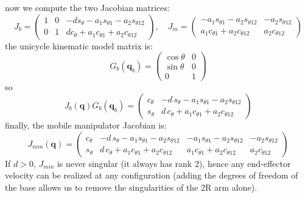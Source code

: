\documentclass[10pt, a4paper]{report}
\newcommand{\q}{{\mathbf q}}
\begin{document}
now we compute the two Jacobian matrices:\begin{equation}
    J_b=\begin{pmatrix}
        1&0&-ds_\theta-a_1s_{\theta1}-a_2s_{\theta12}\\
        0&1&dc_\theta+a_1c_{\theta1}+a_2c_{\theta12}
    \end{pmatrix},\quad 
    J_m=\begin{pmatrix}
        -a_1s_{\theta1}-a_2s_{\theta12}&-a_2s_{\theta12}\\
        a_1c_{\theta1}+a_2c_{\theta12}&a_2c_{\theta12}
    \end{pmatrix}
\end{equation}
the unicycle kinematic model matrix is:
\begin{equation}
    G_b(\q_b)=\begin{pmatrix}
         \cos\theta&0\\\sin\theta&0\\ 0&1
    \end{pmatrix}
\end{equation}
so\begin{equation}
    J_b(\q)G_b(\q_b)=\begin{pmatrix}
c_\theta & -d \, s_\theta - a_1 s_{\theta 1} - a_2 s_{\theta 1 2} \\[6pt]
s_\theta & d \, c_\theta + a_1 c_{\theta 1} + a_2 c_{\theta 1 2} 
\end{pmatrix}
\end{equation}
finally, the mobile manipulator Jacobian is:\begin{equation}
J_{mm}(\q)=\begin{pmatrix}
c_\theta & -d \, s_\theta - a_1 s_{\theta 1} - a_2 s_{\theta 1 2} & -a_1 s_{\theta 1} - a_2 s_{\theta 1 2} & -a_2 s_{\theta 1 2} \\[6pt]
s_\theta & d \, c_\theta + a_1 c_{\theta 1} + a_2 c_{\theta 1 2} & a_1 c_{\theta 1} + a_2 c_{\theta 1 2} & a_2 c_{\theta 1 2}
\end{pmatrix}
\end{equation}
If $d>0$, $J_{mm}$ is never singular (it always has rank 2), hence any end-effector velocity can be realized at any configuration (adding the degrees of freedom of the base
allows us to remove the singularities of the 2R arm alone).
\end{document}
